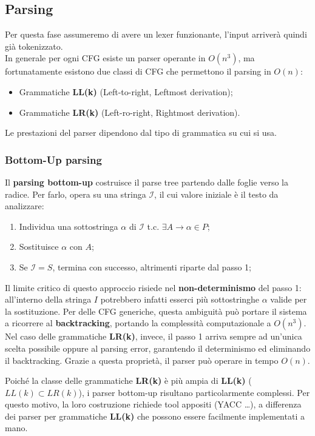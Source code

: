 \documentclass[12pt]{article}
\begin{document}
\subsection{Parsing}
Per questa fase assumeremo di avere un lexer funzionante, l'input arriverà quindi già tokenizzato.\\
In generale per ogni CFG esiste un parser operante in $O(n^3)$, ma fortunatamente esistono due classi di CFG che permettono il parsing in $O(n)$:
\begin{itemize}
    \item Grammatiche \textbf{LL(k)} (Left-to-right, Leftmost derivation);
    \item Grammatiche \textbf{LR(k)} (Left-ro-right, Rightmost derivation).
\end{itemize}
Le prestazioni del parser dipendono dal tipo di grammatica su cui si usa.
\subsubsection{Bottom-Up parsing}
\begin{definition}
Il \textbf{parsing bottom-up} costruisce il parse tree partendo dalle foglie verso la radice.
Per farlo, opera su una stringa $\mathcal{I}$, il cui valore iniziale è il testo da analizzare:
\begin{enumerate}
    \item Individua una sottostringa $\alpha$ di $\mathcal{I}$ t.c. $\exists A \rightarrow \alpha \in P$;
    \item Sostituisce $\alpha$ con $A$;
    \item Se $\mathcal{I} = S$, termina con successo, altrimenti riparte dal passo 1;
\end{enumerate}
\end{definition}
\noindent Il limite critico di questo approccio risiede nel \textbf{non-determinismo} del passo 1: all'interno della stringa $I$ potrebbero infatti esserci più sottostringhe $\alpha$ valide per la sostituzione.
Per delle CFG generiche, questa ambiguità può portare il sistema a ricorrere al \textbf{backtracking}, portando la complessità computazionale a $O(n^3)$.\\
Nel caso delle grammatiche \textbf{LR(k)}, invece, il passo 1 arriva sempre ad un'unica scelta possibile oppure al parsing error, garantendo il determinismo ed eliminando il backtracking. Grazie a questa proprietà, il parser può operare in tempo $O(n)$.

\smallskip
\noindent Poiché la classe delle grammatiche \textbf{LR(k)} è più ampia di \textbf{LL(k)} ($LL(k) \subset LR(k)$), i parser bottom-up risultano particolarmente complessi. Per questo motivo, la loro costruzione richiede tool appositi (YACC \dots), a differenza dei parser per grammatiche \textbf{LL(k)} che possono essere facilmente implementati a mano.
\end{document}
